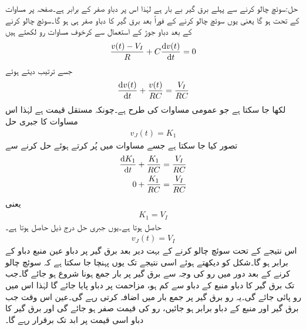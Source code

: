 حل:سوئچ چالو کرنے سے پہلے برق گیر بے بار ہے لہٰذا اس پر دباو صفر کے برابر ہے۔صفحہ  پر مساوات  کے تحت  ہو گا یعنی یوں سوئچ چالو کرنے کے فوراً بعد برق گیر کا دباو صفر ہی ہو گا۔سوئچ چالو کرنے کے بعد  دباو جوڑ  کے استعمال سے کرخوف مساوات رو لکھتے ہیں
\begin{align*}
\frac{v(t)-V_I}{R}+C\frac{\dif v(t)}{\dif t}=0
\end{align*}
جسے ترتیب دیتے ہوئے
\begin{align}\label{مساوات_عارضی_برق_گیر_عارضی_حل_الف}
\frac{\dif v(t)}{\dif t}+\frac{v(t)}{RC}=\frac{V_I}{RC}
\end{align}
لکھا  جا سکتا ہے جو عمومی مساوات  کی طرح ہے۔چونکہ  مستقل قیمت ہے لہٰذا اس مساوات کا جبری حل
\begin{align*}
v_J(t)=K_1
\end{align*}
 تصور کیا جا سکتا ہے جسے  مساوات  میں پُر کرتے ہوئے حل کرنے سے
\begin{align*}
\frac{\dif  K_1}{\dif t}+\frac{K_1}{RC}&=\frac{V_I}{RC}\\
0+\frac{K_1}{RC}&=\frac{V_I}{RC}
\end{align*}
یعنی
\begin{align*}
K_1=V_I
\end{align*}
حاصل ہوتا ہے۔یوں جبری حل درج ذیل حاصل ہوتا ہے۔
\begin{align*}
v_J(t)=V_I
\end{align*}
اس نتیجے کے تحت سوئچ چالو کرنے کے بہت دیر بعد برق گیر پر دباو عین منبع دباو کے برابر ہو گا۔شکل کو دیکھتے ہوئے اسی نتیجے تک یوں پہنچا جا سکتا ہے کہ سوئچ چالو کرنے کے بعد دور میں رو کی وجہ سے برق گیر پر بار جمع ہونا شروع ہو جائے گا۔جب تک برق گیر کا دباو منبع کے دباو سے کم ہو، مزاحمت پر دباو پایا جائے گا لہٰذا اس میں رو پائی جائے گی۔یہ رو برق گیر پر جمع بار میں اضافہ کرتی رہے گی۔عین اس وقت جب برق گیر اور منبع کے دباو برابر ہو جائیں، رو کی قیمت صفر ہو جائے گی اور برق گیر کا دباو اسی قیمت پر ابد تک برقرار رہے گا۔ 

